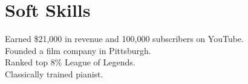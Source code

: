 \section{Soft Skills}

\begin{itemize}[leftmargin=0.15in, label={}]
  \small{
    \item{
      Earned \$21,000 in revenue and 100,000 subscribers on YouTube.\\
      Founded a film company in Pittsburgh. \\
      Ranked top 8\% League of Legends. \\
      Classically trained pianist. \\
    }
  }
\end{itemize}